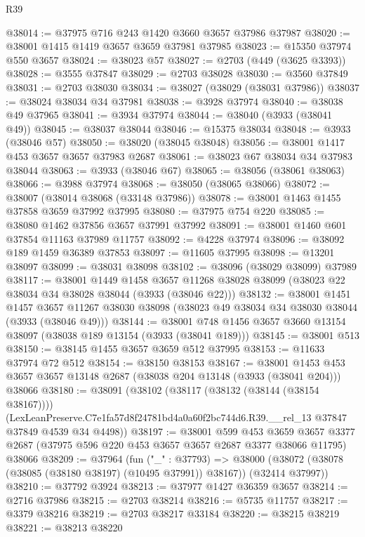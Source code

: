 \begin{lexlean}{R39}
\begin{coremodule}
@38014 := @37975 @716 @243 @1420 @3660 @3657 @37986 @37987
@38020 := @38001 @1415 @1419 @3657 @3659 @37981 @37985
@38023 := @15350 @37974 @550 @3657
@38024 := @38023 @57
@38027 := @2703 (@449 (@3625 @3393))
@38028 := @3555 @37847
@38029 := @2703 @38028
@38030 := @3560 @37849
@38031 := @2703 @38030
@38034 := @38027 (@38029 (@38031 @37986))
@38037 := @38024 @38034 @34 @37981
@38038 := @3928 @37974
@38040 := @38038 @49 @37965
@38041 := @3934 @37974
@38044 := @38040 (@3933 (@38041 @49))
@38045 := @38037 @38044
@38046 := @15375 @38034
@38048 := @3933 (@38046 @57)
@38050 := @38020 (@38045 @38048)
@38056 := @38001 @1417 @453 @3657 @3657 @37983 @2687
@38061 := @38023 @67 @38034 @34 @37983 @38044
@38063 := @3933 (@38046 @67)
@38065 := @38056 (@38061 @38063)
@38066 := @3988 @37974
@38068 := @38050 (@38065 @38066)
@38072 := @38007 (@38014 @38068 (@33148 @37986))
@38078 := @38001 @1463 @1455 @37858 @3659 @37992 @37995
@38080 := @37975 @754 @220
@38085 := @38080 @1462 @37856 @3657 @37991 @37992
@38091 := @38001 @1460 @601 @37854 @11163 @37989 @11757
@38092 := @4228 @37974
@38096 := @38092 @189 @1459 @36389 @37853
@38097 := @11605 @37995
@38098 := @13201 @38097
@38099 := @38031 @38098
@38102 := @38096 (@38029 @38099) @37989
@38117 := @38001
    @1449
    @1458
    @3657
    @11268
    @38028
    @38099
    (@38023 @22 @38034 @34 @38028 @38044 (@3933 (@38046 @22)))
@38132 := @38001
    @1451
    @1457
    @3657
    @11267
    @38030
    @38098
    (@38023 @49 @38034 @34 @38030 @38044 (@3933 (@38046 @49)))
@38144 := @38001 @748 @1456 @3657 @3660 @13154 @38097 (@38038 @189 @13154 (@3933 (@38041 @189)))
@38145 := @38001 @513
@38150 := @38145 @1455 @3657 @3659 @512 @37995
@38153 := @11633 @37974 @72 @512
@38154 := @38150 @38153
@38167 := @38001
    @1453
    @453
    @3657
    @3657
    @13148
    @2687
    (@38038 @204 @13148 (@3933 (@38041 @204)))
    @38066
@38180 := @38091
    (@38102
      (@38117 (@38132 (@38144 (@38154 @38167))))
      (LexLeanPreserve.C7e1fa57d8f24781bd4a0a60f2bc744d6.R39.__rel_13
        @37847
        @37849
        @4539
        @34
        @4498))
@38197 := @38001
    @599
    @453
    @3659
    @3657
    @3377
    @2687
    (@37975 @596 @220 @453 @3657 @3657 @2687 @3377 @38066 @11795)
    @38066
@38209 := @37964
    (fun ("_" : @37793) =>
    @38000 (@38072 (@38078 (@38085 (@38180 @38197) (@10495 @37991)) @38167)) (@32414 @37997))
@38210 := @37792 @3924
@38213 := @37977 @1427 @36359 @3657
@38214 := @2716 @37986
@38215 := @2703 @38214
@38216 := @5735 @11757
@38217 := @3379 @38216
@38219 := @2703 @38217 @33184
@38220 := @38215 @38219
@38221 := @38213 @38220

\end{coremodule}
\end{lexlean}
